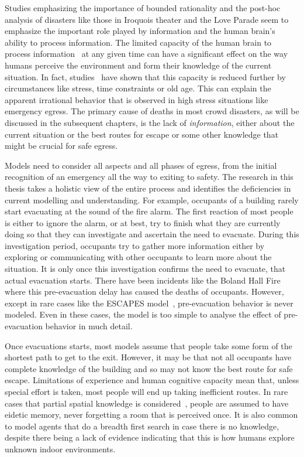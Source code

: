 Studies emphasizing the importance of bounded rationality and the post-hoc analysis of disasters like those in Iroquois theater and the Love Parade seem to emphasize the important role played by information and the human brain's ability to process information. The limited capacity of the human brain to process information~\cite{Miller:1956tr} at any given time can have a significant effect on the way humans perceive the environment and form their knowledge of the current situation. In fact, studies~\cite{Ozel:2001tn,Davis01122009} have shown that this capacity is reduced further by circumstances like stress, time constraints or old age. This can explain the apparent irrational behavior that is observed in high stress situations like emergency egress. The primary cause of deaths in most crowd disasters, as will be discussed in the subsequent chapters, is the lack of \emph{information}, either about the current situation or the best routes for escape or some other knowledge that might be crucial for safe egress.

Models need to consider all aspects and all phases of egress, from the initial recognition of an emergency all the way to exiting to safety. The research in this thesis takes a holistic view of the entire process and identifies the deficiencies in current modelling and understanding. For example, occupants of a building rarely start evacuating at the sound of the fire alarm. The first reaction of most people is either to ignore the alarm, or at best, try to finish what they are currently doing so that they can investigate and ascertain the need to evacuate. During this investigation period, occupants try to gather more information either by exploring or communicating with other occupants to learn more about the situation. It is only once this investigation confirms the need to evacuate, that actual evacuation starts. There have been incidents like the Boland Hall Fire~\cite{Berry:2000us} where this pre-evacuation delay has caused the deaths of occupants. However, except in rare cases like the ESCAPES model~\cite{Tsai:2011tz}, pre-evacuation behavior is never modeled. Even in these cases, the model is too simple to analyse the effect of pre-evacuation behavior in much detail.


Once evacuations starts, most models assume that people take some form of the shortest path to get to the exit. However, it may be that not all occupants have complete knowledge of the building and so may not know the best route for safe escape. Limitations of experience and human cognitive capacity mean that, unless special effort is taken, most people will end up taking inefficient routes. In rare cases that partial spatial knowledge is considered~\cite{Pelechano:2006ba}, people are assumed to have eidetic memory, never forgetting a room that is perceived once. It is also common to model agents that do a breadth first search in case there is no knowledge, despite there being a lack of evidence indicating that this is how humans explore unknown indoor environments.


